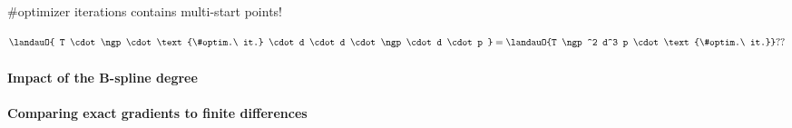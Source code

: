 \#optimizer iterations contains multi-start points!

\begin{equation}
  \landauO{
    T
    \cdot \ngp
    \cdot \text{\#optim.\ it.}
    \cdot d
    \cdot d
    \cdot \ngp
    \cdot d
    \cdot p
  }
  = \landauO{T \ngp^2 d^3 p \cdot \text{\#optim.\ it.}}??
\end{equation}

\dummytext[3]{}

\paragraph{Impact of the B-spline degree}

\dummytext[3]{}

\paragraph{Comparing exact gradients to finite differences}

\dummytext[3]{}
